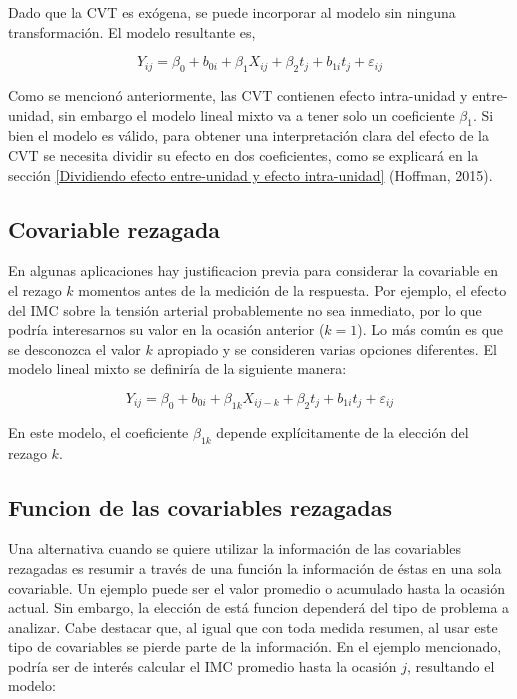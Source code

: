 \documentclass[spanish]{article}
\numberwithin{figure}{subsection}
\numberwithin{equation}{subsection}
\numberwithin{table}{subsection}
\begin{document}
Dado que la CVT es exógena, se puede incorporar al modelo sin ninguna
transformación. El modelo resultante es,

\[ Y_{ij} = \beta_0 + b_{0i} + \beta_1 X_{ij} + \beta_2 t_j + b_{1i} t_j + \varepsilon_{ij} \]

Como se mencionó anteriormente, las CVT contienen efecto intra-unidad y
entre-unidad, sin embargo el modelo lineal mixto va a tener solo un coeficiente
$\beta_1$. Si bien el modelo es válido, para obtener una interpretación clara
del efecto de la CVT se necesita dividir su efecto en dos coeficientes, como se
explicará en la sección \ref{Dividiendo efecto entre-unidad y efecto
intra-unidad} (Hoffman, 2015).


\subsection{Covariable rezagada}

En algunas aplicaciones hay justificacion previa para considerar la covariable
en el rezago $k$ momentos antes de la medición de la respuesta. Por ejemplo, el
efecto del IMC sobre la tensión arterial probablemente no sea inmediato, por lo
que podría interesarnos su valor en la ocasión anterior ($k=1$). Lo más común es
que se desconozca el valor $k$ apropiado y se consideren varias opciones
diferentes. El modelo lineal mixto se definiría de la siguiente manera:

\[ Y_{ij} = \beta_0 + b_{0i} + \beta_{1k} X_{ij-k} + \beta_2 t_j + b_{1i} t_j + \varepsilon_{ij} \]

En este modelo, el coeficiente $\beta_{1k}$ depende explícitamente de la
elección del rezago $k$.

\subsection{Funcion de las covariables rezagadas}

Una alternativa cuando se quiere utilizar la información de las covariables
rezagadas es resumir a través de una función la información de éstas en una sola
covariable. Un ejemplo puede ser el valor promedio o acumulado hasta la ocasión
actual. Sin embargo, la elección de está funcion dependerá del tipo de problema
a analizar. Cabe destacar que, al igual que con toda medida resumen, al usar
este tipo de covariables se pierde parte de la información. En el ejemplo
mencionado, podría ser de interés calcular el IMC promedio hasta la ocasión $j$,
resultando el modelo:
\end{document}

